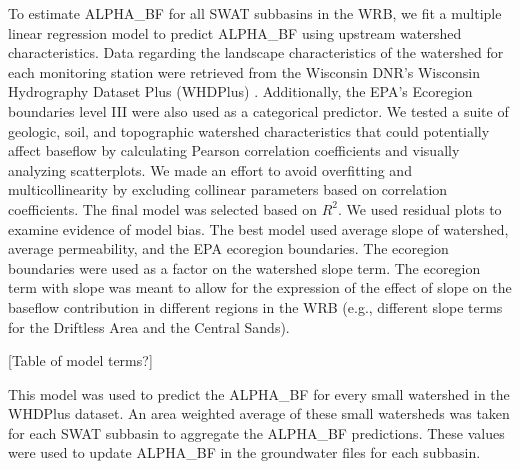 	To estimate ALPHA\_BF for all SWAT subbasins in the WRB, we fit a multiple linear regression model to predict ALPHA\_BF using upstream watershed characteristics. Data regarding the landscape characteristics of the watershed for each monitoring station were retrieved from the Wisconsin DNR's Wisconsin Hydrography Dataset Plus (WHDPlus) \citep{wdnr_whdplus_2013}. Additionally, the EPA's Ecoregion boundaries level III were also used as a categorical predictor. We tested a suite of geologic, soil, and topographic watershed characteristics that could potentially affect baseflow by calculating Pearson correlation coefficients and visually analyzing scatterplots. We made an effort to avoid overfitting and multicollinearity by excluding collinear parameters based on correlation coefficients. The final model was selected based on $R^2$. We used residual plots to examine evidence of model bias. The best model used average slope of watershed, average permeability, and the EPA ecoregion boundaries. The ecoregion boundaries were used as a factor on the watershed slope term. The ecoregion term with slope was meant to allow for the expression of the effect of slope on the baseflow contribution in different regions in the WRB (e.g., different slope terms for the Driftless Area and the Central Sands).
	
	[Table of model terms?]
	
	This model was used to predict the ALPHA\_BF for every small watershed in the WHDPlus dataset. An area weighted average of these small watersheds was taken for each SWAT subbasin to aggregate the ALPHA\_BF predictions. These values were used to update ALPHA\_BF in the groundwater files for each subbasin.